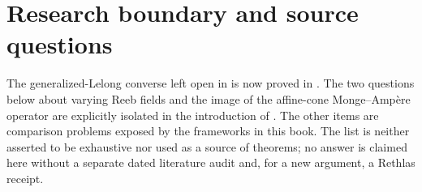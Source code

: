 \section{Research boundary and source questions}
\label{sec:local-research-boundary}

The generalized-Lelong converse left open in \cite{BFJ08} is now proved in
.  The two questions below
about varying Reeb fields and the image of the affine-cone Monge--Amp\`ere
operator are explicitly isolated in the introduction of
\cite{Wu24AffineCones}.  The other items are comparison problems exposed by
the frameworks in this book.  The list is neither asserted to be exhaustive
nor used as a source of theorems; no answer is claimed here without a
separate dated literature audit and, for a new argument, a Rethlas receipt.

